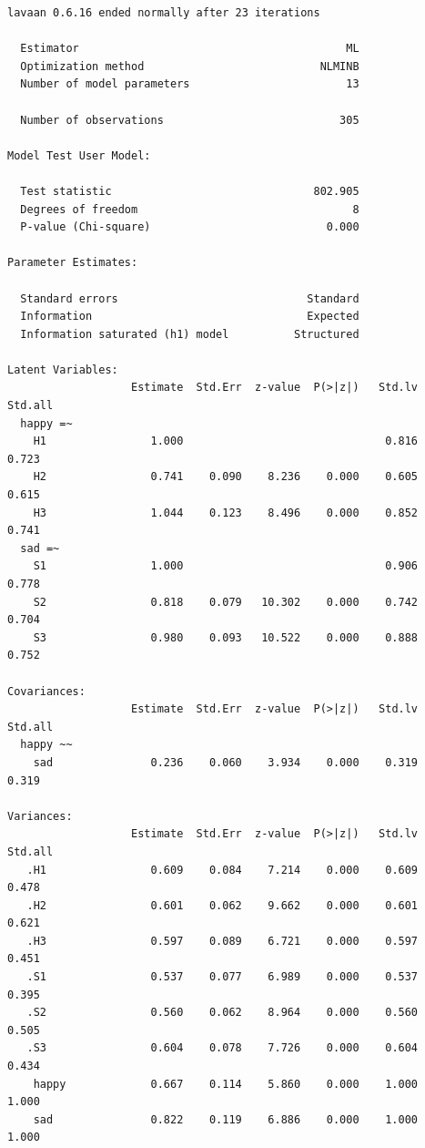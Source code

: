 \documentclass[
  letterpaper,
  DIV=11,
  numbers=noendperiod]{scrreprt}
\begin{document}
\begin{verbatim}
lavaan 0.6.16 ended normally after 23 iterations

  Estimator                                         ML
  Optimization method                           NLMINB
  Number of model parameters                        13

  Number of observations                           305

Model Test User Model:
                                                      
  Test statistic                               802.905
  Degrees of freedom                                 8
  P-value (Chi-square)                           0.000

Parameter Estimates:

  Standard errors                             Standard
  Information                                 Expected
  Information saturated (h1) model          Structured

Latent Variables:
                   Estimate  Std.Err  z-value  P(>|z|)   Std.lv  Std.all
  happy =~                                                              
    H1                1.000                               0.816    0.723
    H2                0.741    0.090    8.236    0.000    0.605    0.615
    H3                1.044    0.123    8.496    0.000    0.852    0.741
  sad =~                                                                
    S1                1.000                               0.906    0.778
    S2                0.818    0.079   10.302    0.000    0.742    0.704
    S3                0.980    0.093   10.522    0.000    0.888    0.752

Covariances:
                   Estimate  Std.Err  z-value  P(>|z|)   Std.lv  Std.all
  happy ~~                                                              
    sad               0.236    0.060    3.934    0.000    0.319    0.319

Variances:
                   Estimate  Std.Err  z-value  P(>|z|)   Std.lv  Std.all
   .H1                0.609    0.084    7.214    0.000    0.609    0.478
   .H2                0.601    0.062    9.662    0.000    0.601    0.621
   .H3                0.597    0.089    6.721    0.000    0.597    0.451
   .S1                0.537    0.077    6.989    0.000    0.537    0.395
   .S2                0.560    0.062    8.964    0.000    0.560    0.505
   .S3                0.604    0.078    7.726    0.000    0.604    0.434
    happy             0.667    0.114    5.860    0.000    1.000    1.000
    sad               0.822    0.119    6.886    0.000    1.000    1.000
\end{verbatim}
\end{document}
